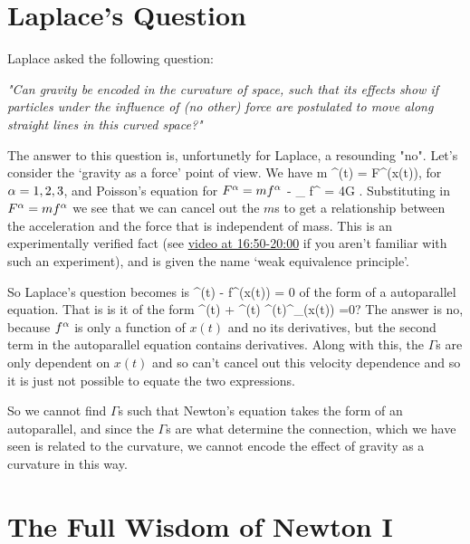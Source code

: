\section{Laplace's Question}

Laplace asked the following question: 
\begin{center}
    \textit{"Can gravity be encoded in the curvature of space, such that its effects show if particles under the influence of (no other) force are postulated to move along straight lines in this curved space?"}
\end{center}

The answer to this question is, unfortunetly for Laplace, a resounding "no". 
\bq 
    Let's consider the `gravity as a force' point of view. We have
    \bse 
        m ^{\a}(t) = F^{\a}\big(x(t)\big),
    \ese
    for $\alpha=1,2,3$, and Poisson's equation for $F^{\alpha}= mf^{\alpha}$
    \bse 
        - \p_{\a} f^{\a} = 4\pi G \rho.
    \ese 
    Substituting in $F^{\alpha}=mf^{\alpha}$ we see that we can cancel out the $m$s to get a relationship between the acceleration and the force that is independent of mass. This is an experimentally verified fact (see \href{https://www.youtube.com/watch?v=IBlCu1zgD4Y&list=PLFeEvEPtX_0S6vxxiiNPrJbLu9aK1UVC_&index=9}{video at 16:50-20:00} if you aren't familiar with such an experiment), and is given the name `weak equivalence principle'.
    
    So Laplace's question becomes is 
    \bse 
        ^{\a}(t) - f^{\a}\big(x(t)\big) = 0
    \ese 
    of the form of a autoparallel equation. That is is it of the form 
    \bse 
        ^{\a}(t) + ^{\beta}(t) ^{\gamma}(t){\Gamma^{\a}}_{\beta\gamma}\big(x(t)\big) =0?
    \ese 
    The answer is no, because $f^{\alpha}$ is only a function of $x(t)$ and no its derivatives, but the second term in the autoparallel equation contains derivatives. Along with this, the $\Gamma$s are only dependent on $x(t)$ and so can't cancel out this velocity dependence and so it is just not possible to equate the two expressions. 
    
    So we cannot find $\Gamma$s such that Newton's equation takes the form of an autoparallel, and since the $\Gamma$s are what determine the connection, which we have seen is related to the curvature, we cannot encode the effect of gravity as a curvature in this way. 
\eq 

\section{The Full Wisdom of Newton I}

